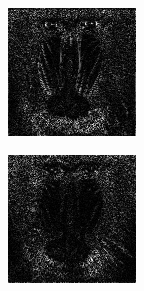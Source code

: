 \begin{figure}
\begin{subfigure}{0.4\textwidth}
       \end{subfigure}%
    \hfill
        \begin{subfigure}{0.4\textwidth}\centering
                    \includegraphics[width=\linewidth]{mandrill3.png}
       \end{subfigure}%
        \begin{subfigure}{0.4\textwidth}\centering
                    \includegraphics[width=\linewidth]{mandrill4.png}

\end{subfigure}
\end{figure}
